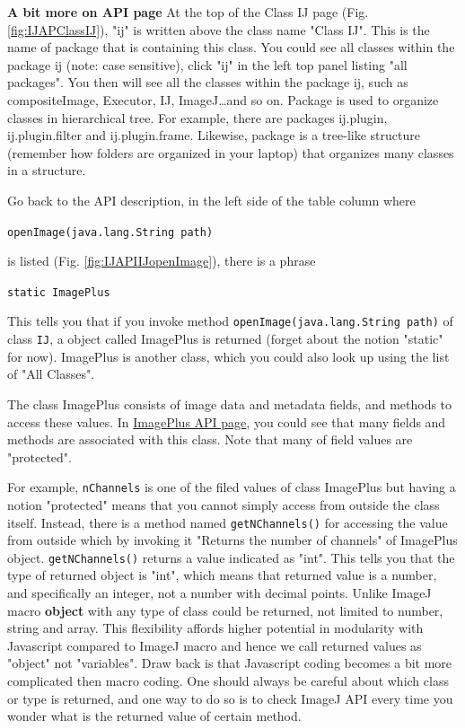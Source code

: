 \documentclass[11pt,a4paper,oneside]{report}
\newcommand{\ilcom}[1]{\texttt{\small#1}}
\begin{document}
 \textbf{A bit more on API page} At the top of the Class IJ page (Fig.\ref{fig:IJAPClassIJ}), 
 "ij" is written above the class name "Class IJ". 
 This is the name of package that is containing this class. 
 You could see all classes within the package ij (note: case sensitive), 
 click "ij" in the left top panel listing "all packages".  
 You then will see all the classes within the package ij, 
 such as compositeImage, Executor, IJ, ImageJ\dots and so on. 
 Package is used to organize classes in hierarchical tree. 
 For example, there are packages ij.plugin, ij.plugin.filter and ij.plugin.frame. 
 Likewise, package is a tree-like structure (remember how folders are organized in your laptop) 
 that organizes many classes in a structure. 
  
Go back to the API description, in the left side of the table column where 

\ilcom{openImage(java.lang.String path) } 

is listed (Fig. \ref{fig:IJAPIIJopenImage}), there is a phrase 

\ilcom{static ImagePlus} 

This tells you that if you invoke method \ilcom{openImage(java.lang.String path)} of class \ilcom{IJ}, 
a object called ImagePlus is returned (forget about the notion "static" for now). 
ImagePlus is another class, which you could also look up using the list of "All Classes".  

The class ImagePlus consists of image data and metadata fields, and methods to access these values. 
In \href{http://rsb.info.nih.gov/ij/developer/api/ij/ImagePlus.html}{ImagePlus API page}, 
you could see that many fields and methods are associated with this class. 
Note that many of field values are "protected". 

For example, \ilcom{nChannels} is one of the filed values of class ImagePlus 
but having a notion "protected" means that you cannot simply access from outside the class itself. 
Instead, there is a method named \ilcom{getNChannels()} for accessing the value 
from outside which by invoking it "Returns the number of channels" of ImagePlus object. 
\ilcom{getNChannels()} returns a value indicated as "int". 
This tells you that the type of returned object is "int", which means that returned value is a number, 
and specifically an integer, not a number with decimal points. Unlike ImageJ macro 
\textbf{object} with any type of class could be returned, not limited to number, string and array. 
This flexibility affords higher potential in modularity with Javascript compared to ImageJ macro 
and hence we call returned values as "object" not "variables". 
Draw back is that Javascript coding becomes a bit more complicated then macro coding. 
One should always be careful about which class or type is returned, 
and one way to do so is to check ImageJ API every time you wonder what is the
returned value of certain method.
\end{document}
